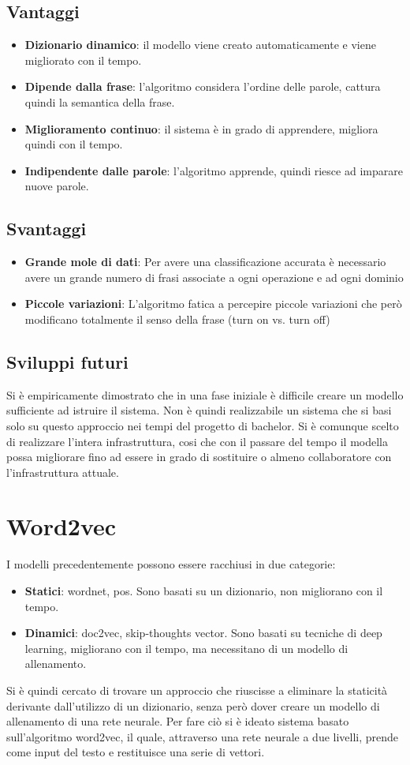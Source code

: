 \documentclass[twoside]{supsistudent}
\begin{document}
\subsection{Vantaggi}
\begin{itemize}
  \item \textbf{Dizionario dinamico}: il modello viene creato automaticamente e viene migliorato con il tempo.
  \item \textbf{Dipende dalla frase}: l'algoritmo considera l'ordine delle parole, cattura quindi la semantica della frase.
  \item \textbf{Miglioramento continuo}: il sistema è in grado di apprendere, migliora quindi con il tempo.
  \item \textbf{Indipendente dalle parole}: l'algoritmo apprende, quindi riesce ad imparare nuove parole.
\end{itemize}
\subsection{Svantaggi}
\begin{itemize}
  \item \textbf{Grande mole di dati}: Per avere una classificazione accurata è necessario avere un grande numero di frasi associate a ogni operazione e ad ogni dominio
  \item \textbf{Piccole variazioni}: L'algoritmo fatica a percepire piccole variazioni che però modificano totalmente il senso della frase (turn on vs. turn off)
\end{itemize}
\subsection{Sviluppi futuri}
Si è empiricamente dimostrato che in una fase iniziale è difficile creare un modello sufficiente ad istruire il sistema. Non è quindi realizzabile un sistema che si basi solo su questo approccio nei tempi del progetto di bachelor. Si è comunque scelto di realizzare l'intera infrastruttura, cosi che con il passare del tempo il modella possa migliorare fino ad essere in grado di sostituire o almeno collaboratore con l'infrastruttura attuale.
\newpage
\section{Word2vec}
I modelli precedentemente possono essere racchiusi in due categorie:
\begin{itemize}
  \item \textbf{Statici}: wordnet, pos. Sono basati su un dizionario, non migliorano con il tempo.
  \item \textbf{Dinamici}: doc2vec, skip-thoughts vector. Sono basati su tecniche di deep learning, migliorano con il tempo, ma necessitano di un modello di allenamento.
\end{itemize}
Si è quindi cercato di trovare un approccio che riuscisse a eliminare la staticità derivante dall'utilizzo di un dizionario, senza però dover creare un modello di allenamento di una rete neurale.
Per fare ciò si è ideato sistema basato sull'algoritmo word2vec, il quale, attraverso una rete neurale a due livelli, prende come input del testo e restituisce una serie di vettori. 
\end{document}
